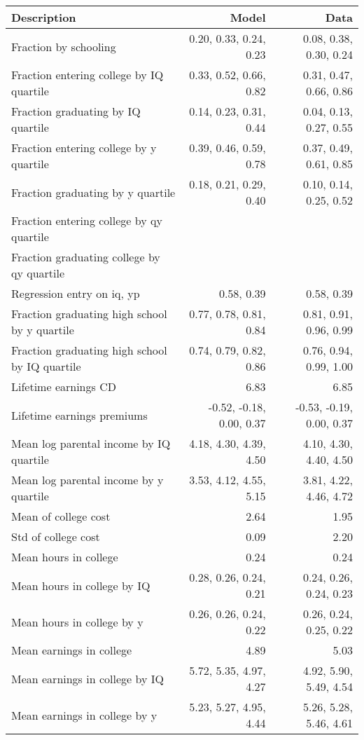 \begin{tabular}{lrr}
\hline
Description & Model  & Data  \\ 
\hline
Fraction by schooling & 0.20, 0.33, 0.24, 0.23  & 0.08, 0.38, 0.30, 0.24  \\ 
Fraction entering college by IQ quartile & 0.33, 0.52, 0.66, 0.82  & 0.31, 0.47, 0.66, 0.86  \\ 
Fraction graduating by IQ quartile & 0.14, 0.23, 0.31, 0.44  & 0.04, 0.13, 0.27, 0.55  \\ 
Fraction entering college by y quartile & 0.39, 0.46, 0.59, 0.78  & 0.37, 0.49, 0.61, 0.85  \\ 
Fraction graduating by y quartile & 0.18, 0.21, 0.29, 0.40  & 0.10, 0.14, 0.25, 0.52  \\ 
Fraction entering college by qy quartile &   &   \\ 
Fraction graduating college by qy quartile &   &   \\ 
Regression entry on iq, yp & 0.58, 0.39  & 0.58, 0.39  \\ 
Fraction graduating high school by y quartile & 0.77, 0.78, 0.81, 0.84  & 0.81, 0.91, 0.96, 0.99  \\ 
Fraction graduating high school by IQ quartile & 0.74, 0.79, 0.82, 0.86  & 0.76, 0.94, 0.99, 1.00  \\ 
Lifetime earnings CD & 6.83  & 6.85  \\ 
Lifetime earnings premiums & -0.52, -0.18, 0.00, 0.37  & -0.53, -0.19, 0.00, 0.37  \\ 
Mean log parental income by IQ quartile & 4.18, 4.30, 4.39, 4.50  & 4.10, 4.30, 4.40, 4.50  \\ 
Mean log parental income by y quartile & 3.53, 4.12, 4.55, 5.15  & 3.81, 4.22, 4.46, 4.72  \\ 
Mean of college cost & 2.64  & 1.95  \\ 
Std of college cost & 0.09  & 2.20  \\ 
Mean hours in college & 0.24  & 0.24  \\ 
Mean hours in college by IQ & 0.28, 0.26, 0.24, 0.21  & 0.24, 0.26, 0.24, 0.23  \\ 
Mean hours in college by y & 0.26, 0.26, 0.24, 0.22  & 0.26, 0.24, 0.25, 0.22  \\ 
Mean earnings in college & 4.89  & 5.03  \\ 
Mean earnings in college by IQ & 5.72, 5.35, 4.97, 4.27  & 4.92, 5.90, 5.49, 4.54  \\ 
Mean earnings in college by y & 5.23, 5.27, 4.95, 4.44  & 5.26, 5.28, 5.46, 4.61  \\ 

\end{tabular}
